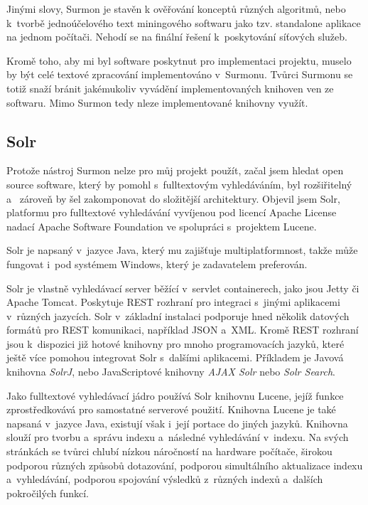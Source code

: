 Jinými slovy, Surmon je stavěn k ověřování konceptů různých algoritmů, nebo k~tvorbě jednoúčelového text miningového softwaru jako tzv. standalone aplikace na jednom počítači. Nehodí se na finální řešení k~poskytování síťových služeb.

Kromě toho, aby mi byl software poskytnut pro implementaci projektu, muselo by být celé textové zpracování implementováno v~Surmonu. Tvůrci Surmonu se totiž snaží bránit jakémukoliv vyvádění implementovaných knihoven ven ze softwaru. Mimo Surmon tedy nleze implementované knihovny využít.

\subsection{Solr}
Protože nástroj Surmon nelze pro můj projekt použít, začal jsem hledat open source software, který by pomohl s~fulltextovým vyhledáváním, byl rozšiřitelný a~ zároveň by šel zakomponovat do složitější architektury. Objevil jsem Solr\cite{sorl:wiki}, platformu pro fulltextové vyhledávání vyvíjenou pod licencí Apache License nadací Apache Software Foundation ve spolupráci s~projektem Lucene. 

Solr je napsaný v~jazyce Java, který mu  zajišťuje multiplatformnost, takže může fungovat i~pod systémem Windows, který je zadavatelem preferován.

Solr je vlastně vyhledávací server běžící v~servlet containerech, jako jsou Jetty či Apache Tomcat. Poskytuje REST rozhraní  pro integraci s~jinými aplikacemi v~různých jazycích. Solr v~základní instalaci podporuje hned několik datových formátů pro REST komunikaci, například JSON a~XML. Kromě REST rozhraní jsou k~dispozici již hotové knihovny pro mnoho programovacích jazyků, které ještě více pomohou integrovat Solr s~dalšími aplikacemi. Příkladem je Javová knihovna \emph{SolrJ}, nebo JavaScriptové knihovny \emph{AJAX Solr} nebo \emph{Solr Search}.

Jako fulltextové vyhledávací jádro používá Solr knihovnu Lucene, jejíž funkce zprostředkovává pro samostatné serverové použití. Knihovna Lucene je také napsaná v~jazyce Java, existují však i~její portace do jiných jazyků. Knihovna slouží pro tvorbu a~správu indexu a~následné vyhledávání v~indexu. Na svých stránkách\cite{lucene:wiki} se tvůrci chlubí nízkou náročností na hardware počítače, širokou podporou různých způsobů dotazování, podporou simultálního aktualizace indexu a~vyhledávání, podporou spojování výsledků z~různých indexů a~dalších pokročilých funkcí.


